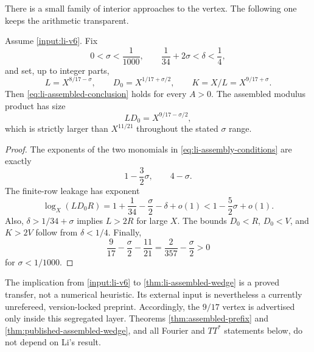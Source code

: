 There is a small family of interior approaches to the vertex.  The
following one keeps the arithmetic transparent.

\begin{corollary}
\label{cor:li-explicit-prefix}
Assume \cref{input:li-v6}.  Fix
\begin{equation}
 0<\sigma<\frac1{1000},
 \qquad
 \frac1{34}+2\sigma<\delta<\frac14,
 \label{eq:li-delta-sigma-range}
\end{equation}
and set, up to integer parts,
\begin{equation}
 L=X^{8/17-\sigma},
 \qquad
 D_0=X^{1/17+\sigma/2},
 \qquad
 K=X/L=X^{9/17+\sigma}.
 \label{eq:li-explicit-scales}
\end{equation}
Then \eqref{eq:li-assembled-conclusion} holds for every $A>0$.  The
assembled modulus product has size
\begin{equation}
 LD_0=X^{9/17-\sigma/2},
 \label{eq:li-total-modulus}
\end{equation}
which is strictly larger than $X^{11/21}$ throughout the stated
$\sigma$ range.
\end{corollary}

\begin{proof}
The exponents of the two monomials in
\eqref{eq:li-assembly-conditions} are exactly
\begin{equation}
 1-\frac32\sigma,
 \qquad
 4-\sigma.
 \label{eq:li-monomial-check}
\end{equation}
The finite-row leakage has exponent
\begin{equation}
 \log_X(LD_0R)
 =1+\frac1{34}-\frac\sigma2-\delta+o(1)
 <1-\frac52\sigma+o(1).
 \label{eq:li-leakage-check}
\end{equation}
Also, $\delta>1/34+\sigma$ implies $L>2R$ for large $X$.
The bounds $D_0<R$, $D_0<V$, and $K>2V$ follow from
$\delta<1/4$.  Finally,
\begin{equation}
 \frac9{17}-\frac\sigma2-\frac{11}{21}
 =\frac2{357}-\frac\sigma2>0
 \label{eq:li-beats-eleven-twenty-one}
\end{equation}
for $\sigma<1/1000$.
\end{proof}

\begin{remark}
The implication from \cref{input:li-v6} to
\cref{thm:li-assembled-wedge} is a proved transfer, not a numerical
heuristic.  Its external input is nevertheless a currently unrefereed,
version-locked preprint.  Accordingly, the $9/17$ vertex is advertised
only inside this segregated layer.  Theorems
\ref{thm:assembled-prefix} and \ref{thm:published-assembled-wedge}, and
all Fourier and $TT^*$ statements below, do not depend on Li's result.
\end{remark}
